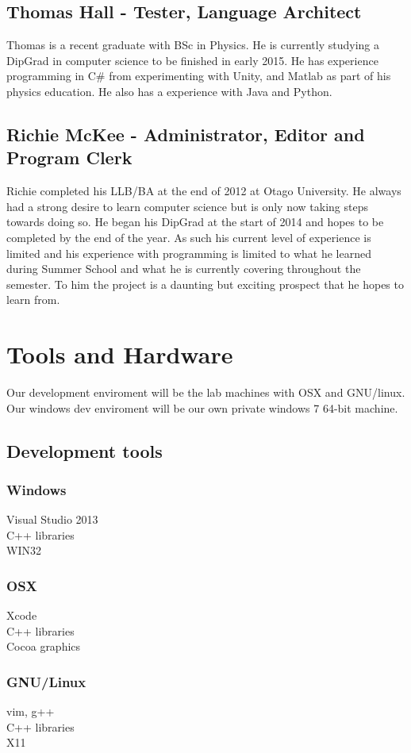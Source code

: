 \documentclass[a4paper,12pt]{article}
\begin{document}
\subsection*{Thomas Hall - \small Tester, Language Architect}
Thomas is a recent graduate with BSc in Physics. He is currently studying a DipGrad in computer science to be finished in early 2015. He has experience programming in C\# from experimenting with Unity, and Matlab as part of his physics education. He also has a experience with Java and Python.

\subsection*{Richie McKee - \small Administrator, Editor and Program Clerk}
Richie completed his LLB/BA at the end of 2012 at Otago University. He always had a strong desire to learn computer science but is only now taking steps towards doing so. He began his DipGrad at the start of 2014 and hopes to be completed by the end of the year. As such his current level of experience is limited and his experience with programming is limited to what he learned during Summer School and what he is currently covering throughout the semester. To him the project is a daunting but exciting prospect that he hopes to learn from.

\pagebreak
\section*{Tools and Hardware}

Our development enviroment will be the lab machines with OSX and GNU/linux.
Our windows dev enviroment will be our own private windows 7 64-bit machine.
\subsection*{Development tools}
\begin{multicols}{3}
  \subsubsection*{Windows}
  Visual Studio 2013 \\
  C++ libraries \\
  WIN32 \columnbreak
  \subsubsection*{OSX}
  Xcode \\
  C++ libraries \\
  Cocoa graphics \columnbreak
  \subsubsection*{GNU/Linux}
  vim, g++ \\
  C++ libraries \\
  X11
\end{multicols}
\end{document}
